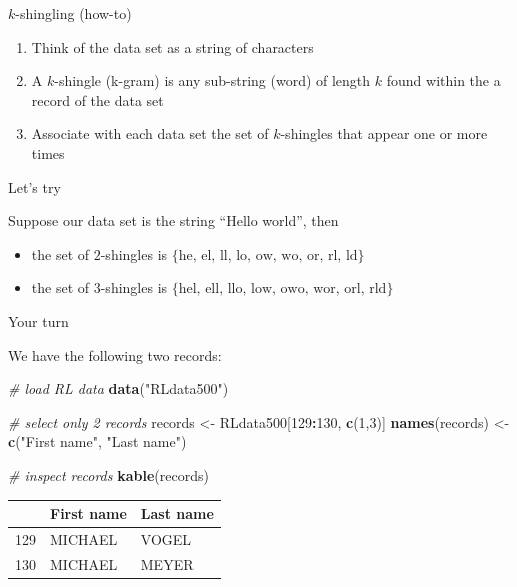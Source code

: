 \documentclass[
  ignorenonframetext,
]{beamer}
\newenvironment{Shaded}{\begin{snugshade}}{\end{snugshade}}
\newcommand{\CommentTok}[1]{\textcolor[rgb]{0.56,0.35,0.01}{\textit{#1}}}
\newcommand{\DecValTok}[1]{\textcolor[rgb]{0.00,0.00,0.81}{#1}}
\newcommand{\KeywordTok}[1]{\textcolor[rgb]{0.13,0.29,0.53}{\textbf{#1}}}
\newcommand{\NormalTok}[1]{#1}
\newcommand{\OperatorTok}[1]{\textcolor[rgb]{0.81,0.36,0.00}{\textbf{#1}}}
\newcommand{\StringTok}[1]{\textcolor[rgb]{0.31,0.60,0.02}{#1}}
\providecommand{\tightlist}{%
  \setlength{\itemsep}{0pt}\setlength{\parskip}{0pt}}
\begin{document}
\begin{frame}{\(k\)-shingling (how-to)}
\protect\hypertarget{k-shingling-how-to}{}

\begin{enumerate}
\tightlist
\item
  Think of the data set as a string of characters \vfill
\item
  A \(k\)-shingle (k-gram) is any sub-string (word) of length \(k\)
  found within the a record of the data set \vfill
\item
  Associate with each data set the set of \(k\)-shingles that appear one
  or more times \vfill
\end{enumerate}

\end{frame}

\begin{frame}{Let's try}
\protect\hypertarget{lets-try}{}

Suppose our data set is the string ``Hello world'', then

\begin{itemize}
\tightlist
\item
  the set of \(2\)-shingles is
  \(\{\text{he, el, ll, lo, ow, wo, or, rl, ld}\}\) \vfill
\item
  the set of \(3\)-shingles is
  \(\{\text{hel, ell, llo, low, owo, wor, orl, rld}\}\) \vfill
\end{itemize}

\end{frame}

\begin{frame}[fragile]{Your turn}
\protect\hypertarget{your-turn}{}

We have the following two records:

\begin{Shaded}
\begin{Highlighting}[]
\CommentTok{# load RL data}
\KeywordTok{data}\NormalTok{(}\StringTok{"RLdata500"}\NormalTok{)}

\CommentTok{# select only 2 records}
\NormalTok{records <-}\StringTok{ }\NormalTok{RLdata500[}\DecValTok{129}\OperatorTok{:}\DecValTok{130}\NormalTok{, }\KeywordTok{c}\NormalTok{(}\DecValTok{1}\NormalTok{,}\DecValTok{3}\NormalTok{)]}
\KeywordTok{names}\NormalTok{(records) <-}\StringTok{ }\KeywordTok{c}\NormalTok{(}\StringTok{"First name"}\NormalTok{, }\StringTok{"Last name"}\NormalTok{)}

\CommentTok{# inspect records}
\KeywordTok{kable}\NormalTok{(records)}
\end{Highlighting}
\end{Shaded}

\begin{longtable}[]{@{}lll@{}}
\toprule
& First name & Last name\tabularnewline
\midrule
\endhead
129 & MICHAEL & VOGEL\tabularnewline
130 & MICHAEL & MEYER\tabularnewline
\bottomrule
\end{longtable}

\end{frame}
\end{document}
